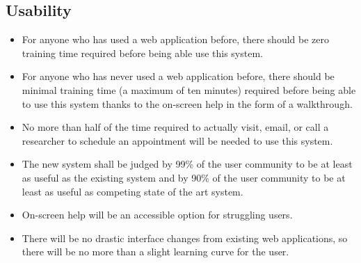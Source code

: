\subsection{Usability}
\begin{itemize}
\item For anyone who has used a web application before, there should be zero training time required before being able use this system.
\item For anyone who has never used a web application before, there should be minimal training time (a maximum of ten minutes) required before being able to use this system thanks to the on-screen help in the form of a walkthrough.
\item No more than half of the time required to actually visit, email, or call a researcher to schedule an appointment will be needed to use this system.
\item The new system shall be judged by 99\% of the user community to be at least as useful as the existing system and by 90\% of the user community to be at least as useful as competing state of the art system.
\item On-screen help will be an accessible option for struggling users.
\item There will be no drastic interface changes from existing web applications, so there will be no more than a slight learning curve for the user.
\end{itemize}
